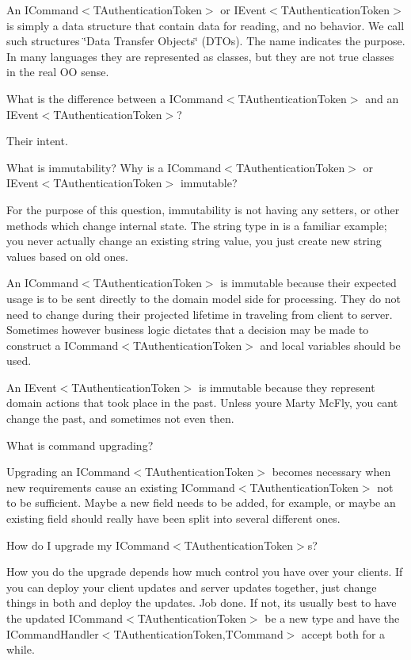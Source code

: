 An I\+Command$<$\+T\+Authentication\+Token$>$ or I\+Event$<$\+T\+Authentication\+Token$>$ is simply a data structure that contain data for reading, and no behavior. We call such structures \char`\"{}\+Data Transfer Objects\char`\"{} (D\+T\+Os). The name indicates the purpose. In many languages they are represented as classes, but they are not true classes in the real OO sense.

What is the difference between a I\+Command$<$\+T\+Authentication\+Token$>$ and an I\+Event$<$\+T\+Authentication\+Token$>$?

Their intent.

What is immutability? Why is a I\+Command$<$\+T\+Authentication\+Token$>$ or I\+Event$<$\+T\+Authentication\+Token$>$ immutable?

For the purpose of this question, immutability is not having any setters, or other methods which change internal state. The string type in is a familiar example; you never actually change an existing string value, you just create new string values based on old ones.

An I\+Command$<$\+T\+Authentication\+Token$>$ is immutable because their expected usage is to be sent directly to the domain model side for processing. They do not need to change during their projected lifetime in traveling from client to server. Sometimes however business logic dictates that a decision may be made to construct a I\+Command$<$\+T\+Authentication\+Token$>$ and local variables should be used.

An I\+Event$<$\+T\+Authentication\+Token$>$ is immutable because they represent domain actions that took place in the past. Unless you\textquotesingle{}re Marty Mc\+Fly, you can\textquotesingle{}t change the past, and sometimes not even then.

What is command upgrading?

Upgrading an I\+Command$<$\+T\+Authentication\+Token$>$ becomes necessary when new requirements cause an existing I\+Command$<$\+T\+Authentication\+Token$>$ not to be sufficient. Maybe a new field needs to be added, for example, or maybe an existing field should really have been split into several different ones.

How do I upgrade my I\+Command$<$\+T\+Authentication\+Token$>$s?

How you do the upgrade depends how much control you have over your clients. If you can deploy your client updates and server updates together, just change things in both and deploy the updates. Job done. If not, it\textquotesingle{}s usually best to have the updated I\+Command$<$\+T\+Authentication\+Token$>$ be a new type and have the I\+Command\+Handler$<$\+T\+Authentication\+Token,\+T\+Command$>$ accept both for a while.

